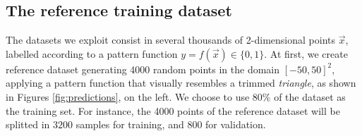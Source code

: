 \subsection{The reference training dataset}
\label{ssec:standard_dataset}

The datasets we exploit consist in several thousands of 2-dimensional points $\vec{x}$, labelled according to a pattern function $y = f(\vec{x}) \in \{0,1\}$. At first, we create reference dataset generating 4000 random points in the domain $[-50, 50]^2$, applying a pattern function that visually resembles a trimmed \emph{triangle}, as shown in Figures \ref{fig:predictions}, on the left. We choose to use $80\%$ of the dataset as the training set. For instance, the 4000 points of the reference dataset will be splitted in $3200$ samples for training, and $800$ for validation.

